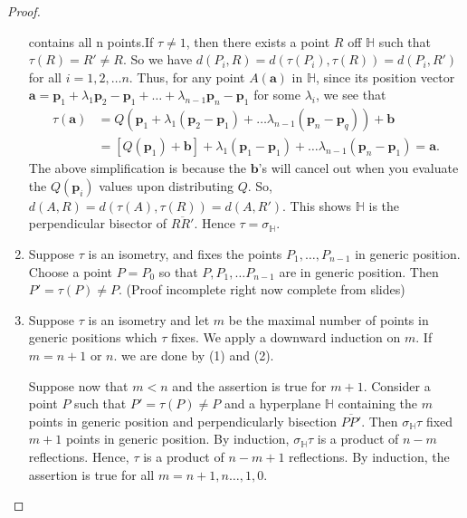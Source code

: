 \begin{proof}
\begin{enumerate}
    contains all n points.If \( \tau \neq 1 \), then there exists a point \( R \) off \( \mathbb{H} \) such that
    \( \tau \left( R \right) = R' \neq R\). So we have \( d(P_{i}, R) = d(\tau \left( P_i \right), \tau \left( R \right)) = d \left( P_i , R'\right)\)
    for all \( i = 1,2, \ldots n \). Thus, for any point \( A(\mathbf{a}) \) in \( \mathbb{H} \), since its position vector 
    \( \mathbf{a} = \mathbf{p}_1 + \lambda_{1}\mathbf{p}_{2} - \mathbf{p}_1 + \ldots + \lambda_{n-1} \mathbf{p}_n - \mathbf{p}_1 \) for some 
    \( \lambda_{i} \), we see that
    \begin{align*}
      \tau \left( \mathbf{a} \right) &= Q \left( \mathbf{p}_1 + \lambda_1 \left(\mathbf{p}_2 - \mathbf{p}_1  \right) + \ldots \lambda_{n-1}(\mathbf{p}_n - \mathbf{p}_q) \right) + \mathbf{b} \\ 
                                     &= \left[ Q \left( \mathbf{p}_1 \right) + \mathbf{b} \right] + \lambda_{1} \left( \mathbf{p}_1 - \mathbf{p}_1 \right) + \ldots \lambda_{n-1} (\mathbf{p}_n - \mathbf{p}_1) = \mathbf{a} 
    .\end{align*}
    The above simplification is because the \( \mathbf{b} \)'s will cancel out when you evaluate the \( Q(\mathbf{p}_i) \) values upon distributing \( Q \).
    So, \( d (A, R) = d \left( \tau \left( A \right), \tau \left( R \right) \right) = d \left( A, R' \right).  \) This shows \( \mathbb{H} \) is the perpendicular
    bisector of \( \overline{R R'} \). Hence \( \tau = \sigma_{\mathbb{H}}  \).

  \item Suppose \( \tau  \) is an isometry, and fixes the points \( P_1, \ldots , P_{n-1} \) in generic position. Choose a point \( P = P_{0} \) so that \( P, P_{1}, \ldots P_{n-1} \) are in generic position.
  Then \( P' = \tau \left( P \right) \neq P \).  (Proof incomplete right now complete from slides)

\item Suppose \( \tau  \) is an isometry and let \( m \) be the maximal number of points in generic positions which \( \tau  \) fixes.
  We apply a downward induction on \( m \). If \( m = n+1 \) or \( n \). we are done by (1) and (2).

  Suppose now that \( m < n \) and the assertion is true for \( m+1 \). Consider a point \( P \) such that \( P' = \tau \left(P  \right) \neq P\) and
  a hyperplane \( \mathbb{H} \) containing the \( m \) points in generic position and perpendicularly bisection \( \overline{P P'} \). Then \( \sigma_{\mathbb{H}} \tau  \) fixed \( m+1 \) points in generic position.
  By induction, \( \sigma_{\mathbb{H}} \tau \) is a product of \( n-m \) reflections. Hence, \( \tau  \) is a 
  product of \( n-m + 1 \) reflections. By induction, the assertion is true for all \( m = n+1,n \ldots ,1,0 \).

  \end{enumerate}
\end{proof}

